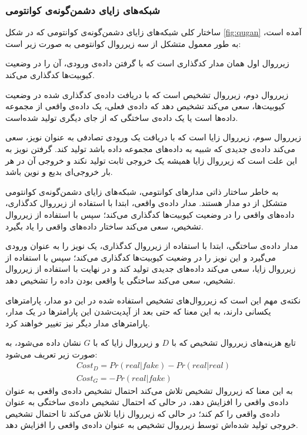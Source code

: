 \subsubsection{شبکه‌های زایای دشمن‌گونه‌ی کوانتومی} \label{sec:qugan}
ساختار کلی شبکه‌های زایای دشمن‌گونه‌ی کوانتومی که در شکل 
\ref{fig:qugan}
آمده است، به طور معمول متشکل از سه زیرروال کوانتومی به صورت زیر است:

زیرروال اول همان مدار کدگذاری است که با گرفتن داده‌ی ورودی، آن را در وضعیت کیوبیت‌ها کدگذاری می‌کند.

زیرروال دوم، زیرروال تشخیص است که با دریافت داده‌ی کدگذاری شده در وضعیت کیوبیت‌ها، سعی می‌کند تشخیص دهد که داده‌ی فعلی، یک داده‌ی واقعی از مجموعه داده‌ها است یا یک داده‌ی ساختگی که از جای دیگری تولید شده‌است.

زیرروال سوم، زیرروال زایا است که با دریافت یک ورودی تصادفی به عنوان نویز، سعی می‌کند داده‌ی جدیدی که شبیه به داده‌های مجموعه داده باشد تولید کند. گرفتن نویز به این علت است که زیرروال زایا همیشه یک خروجی ثابت تولید نکند و خروجی آن در هر بار خروجی‌ای بدیع و نوین باشد.

به خاطر ساختار ذاتی مدارهای کوانتومی، شبکه‌های زایای دشمن‌گونه‌ی کوانتومی متشکل از دو مدار هستند.
مدار داده‌ی واقعی، ابتدا با استفاده از زیرروال کدگذاری، داده‌های واقعی را در وضعیت کیوبیت‌ها کدگذاری می‌کند؛ سپس با استفاده از زیرروال تشخیص، سعی می‌کند ساختار داده‌های واقعی را یاد بگیرد.

مدار داده‌ی ساختگی، ابتدا با استفاده از زیرروال کدگذاری، یک نویز را به عنوان ورودی می‌گیرد و این نویز را  در وضعیت کیوبیت‌ها کدگذاری می‌کند؛ سپس با استفاده از زیرروال زایا، سعی می‌کند داده‌های جدیدی تولید کند و در نهایت با استفاده از زیرروال تشخیص، سعی می‌کند ساختگی یا واقعی بودن داده را تشخیص دهد.

نکته‌ی مهم این است که زیرروال‌های تشخیص استفاده شده در این دو مدار، پارامترهای یکسانی دارند، به این معنا که حتی بعد از آپدیت‌شدن این پارامترها در یک مدار، پارامترهای مدار دیگر نیز تغییر خواهند کرد.

تابع هزینه‌های زیرروال تشخیص که با 
$D$
و زیرروال زایا که با
$G$
نشان داده می‌شود، به صورت زیر تعریف می‌شود:
\begin{equation} \label{eqn:qugan_cost}
    \begin{gathered}
        Cost_D = Pr(real|fake) - Pr(real|real)  \\
        Cost_G = -Pr(real|fake)
    \end{gathered}
\end{equation}
به این معنا که زیرروال تشخیص تلاش می‌کند احتمال تشخیص داده‌ی واقعی به عنوان داده‌ی واقعی را افزایش دهد، در حالی که احتمال تشخیص داده‌ی ساختگی به عنوان داده‌ی واقعی را کم کند؛ در حالی که زیرروال زایا تلاش می‌کند تا احتمال تشخیص خروجی تولید شده‌اش توسط زیرروال تشخیص به عنوان داده‌ی واقعی را افزایش دهد.


